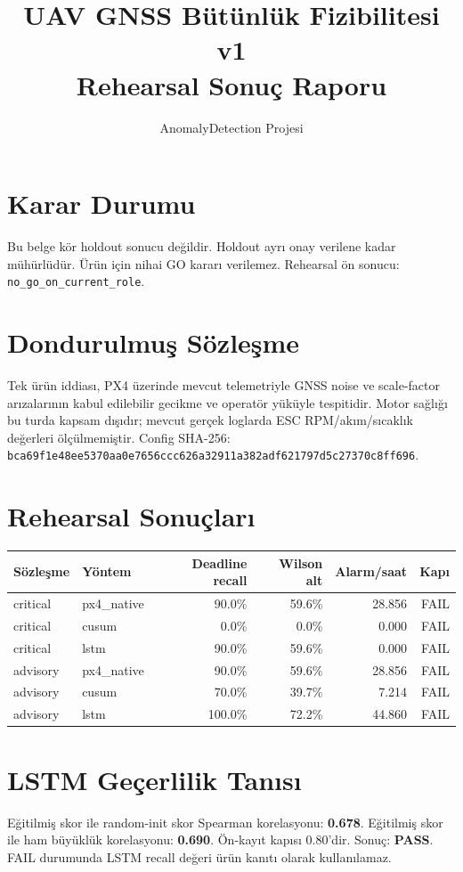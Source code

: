 \documentclass[11pt,a4paper]{article}
\title{UAV GNSS Bütünlük Fizibilitesi v1\\Rehearsal Sonuç Raporu}
\author{AnomalyDetection Projesi}
\date{}
\begin{document}
\maketitle
\section{Karar Durumu}
Bu belge kör holdout sonucu değildir. Holdout ayrı onay verilene kadar mühürlüdür.
Ürün için nihai GO kararı verilemez. Rehearsal ön sonucu: \texttt{no\_go\_on\_current\_role}.

\section{Dondurulmuş Sözleşme}
Tek ürün iddiası, PX4 üzerinde mevcut telemetriyle GNSS noise ve scale-factor
arızalarının kabul edilebilir gecikme ve operatör yüküyle tespitidir. Motor sağlığı
bu turda kapsam dışıdır; mevcut gerçek loglarda ESC RPM/akım/sıcaklık değerleri
ölçülmemiştir. Config SHA-256: \texttt{bca69f1e48ee5370aa0e7656ccc626a32911a382adf621797d5c27370c8ff696}.

\section{Rehearsal Sonuçları}
\begin{tabular}{llrrrr}
\toprule
Sözleşme & Yöntem & Deadline recall & Wilson alt & Alarm/saat & Kapı \\
\midrule
critical & px4\_native & 90.0\% & 59.6\% & 28.856 & FAIL \\
critical & cusum & 0.0\% & 0.0\% & 0.000 & FAIL \\
critical & lstm & 90.0\% & 59.6\% & 0.000 & FAIL \\
advisory & px4\_native & 90.0\% & 59.6\% & 28.856 & FAIL \\
advisory & cusum & 70.0\% & 39.7\% & 7.214 & FAIL \\
advisory & lstm & 100.0\% & 72.2\% & 44.860 & FAIL \\
\bottomrule
\end{tabular}

\section{LSTM Geçerlilik Tanısı}
Eğitilmiş skor ile random-init skor Spearman korelasyonu:
\textbf{0.678}.
Eğitilmiş skor ile ham büyüklük korelasyonu:
\textbf{0.690}.
Ön-kayıt kapısı 0.80'dir. Sonuç:
\textbf{PASS}.
FAIL durumunda LSTM recall değeri ürün kanıtı olarak kullanılamaz.
\end{document}
